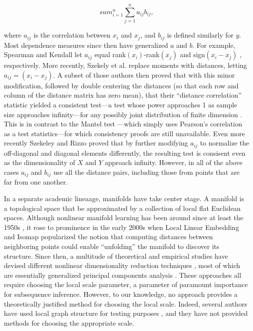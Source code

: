 \documentclass[11pt]{article}
\begin{document}
$$sum_{i=1}^n \sum_{j=1}^n a_{ij} b_{ij}, $$

where $a_{ij}$ is the correlation between $x_i$ and $x_j$, and $b_{ij}$ is defined similarly for $y$.  Most dependence measures since then have generalized $a$ and $b$.  For example, Spearman and Kendall let $a_{ij}$ equal rank$(x_i)$-rank$(x_j)$ and sign$(x_i-x_j)$ \cite{KendallBook}, respectively.  More recently, Szekely et al. \cite{SzekelyRizzoBakirov2007} replace moments with distances, letting  $a_{ij}=(x_i-x_j)$.  A subset of those authors then proved that with this minor modification, followed by double centering the distances (so that each row and column of the distance matrix has zero mean), that their ``distance correlation'' statistic yielded a consistent test---a test whose power approaches 1 as sample size approaches infinity---for any possibly joint distribution of finite dimension \cite{SzekelyRizzo2009}. This is in contrast to the Mantel test \cite{Mantel1967}---which simply uses Pearson's correlation as a test statistics---for which consistency proofs are still unavailable.
 Even more recently Szekeley and Rizzo proved that by further modifying $a_{ij}$ to normalize the off-diagonal and diagonal elements differently, the resulting test is consisent even as the dimensionality of $X$ and $Y$ approach infinity.  However, in all of the above cases $a_{ij}$ and $b_{ij}$ use all the distance pairs, including those from points that are far from one another.

 In a separate academic lineaage, manifolds have take center stage.  A manifold is a topological space that be approximated by a collection of local flat Euclidean spaces.  Although nonlinear manifold learning has been around since at least the 1950s \cite{TorgersonBook}, it rose to prominence in the early 2000s when Local Linear Embedding \cite{Roweis200} and Isomap \cite{Tenenbaum2000} popularized the notion that computing distances between neighboring points could enable ``unfolding'' the manifold to discover its structure.  Since then, a multitude of theoretical and empirical studies have devised different nonlinear dimensionality reduction techniques \cite{LeeVerleysen2007}, most of which are essentially generalized principal components analysis \cite{ScholkopfSmolaMuller1999}.  These approaches all require choosing the local scale parameter, a parameter of paramount importance for subsequence inference.  However, to our knowledge, no approach provides a theoretically justified method for choosing the local scale. Indeed,  several authors have used local graph structure for testing purposes \cite{David1966,Friedman1983,Schilling1986,Dumcke2014}, and they have not provided methods for choosing the appropriate scale.
\end{document}
